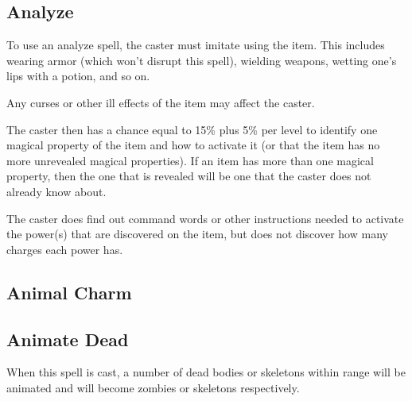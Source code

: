 \begin{multicols*}{2}
\subsection{Analyze}\label{spell:Analyze}

To use an analyze spell, the caster must imitate using the item. This includes wearing armor (which won’t disrupt this spell), wielding weapons, wetting one’s lips with a potion, and so on.

Any curses or other ill effects of the item may affect the caster.

The caster then has a chance equal to 15\% plus 5\% per level to identify one magical property of the item and how to activate it (or that the item has no more unrevealed magical properties). If an item has more than one magical property, then the one that is revealed will be one that the caster does not already know about.

The caster does find out command words or other instructions needed to activate the power(s) that are discovered on the item, but does not discover how many charges each power has.

\subsection{Animal Charm}\label{spell:Animal Charm}


\subsection{Animate Dead}\label{spell:Animate Dead}

When this spell is cast, a number of dead bodies or skeletons within range will be animated and will become zombies or skeletons respectively.


\end{multicols*}
